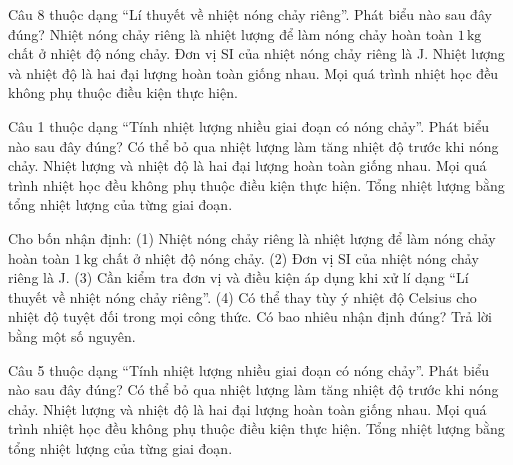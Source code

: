 \begin{ex}
Câu 8 thuộc dạng “Lí thuyết về nhiệt nóng chảy riêng”. Phát biểu nào sau đây đúng?
\choice
{\True Nhiệt nóng chảy riêng là nhiệt lượng để làm nóng chảy hoàn toàn $1\,\text{kg}$ chất ở nhiệt độ nóng chảy.}
{Đơn vị SI của nhiệt nóng chảy riêng là J.}
{Nhiệt lượng và nhiệt độ là hai đại lượng hoàn toàn giống nhau.}
{Mọi quá trình nhiệt học đều không phụ thuộc điều kiện thực hiện.}
\end{ex}

\begin{ex}
Câu 1 thuộc dạng “Tính nhiệt lượng nhiều giai đoạn có nóng chảy”. Phát biểu nào sau đây đúng?
\choice
{Có thể bỏ qua nhiệt lượng làm tăng nhiệt độ trước khi nóng chảy.}
{Nhiệt lượng và nhiệt độ là hai đại lượng hoàn toàn giống nhau.}
{Mọi quá trình nhiệt học đều không phụ thuộc điều kiện thực hiện.}
{\True Tổng nhiệt lượng bằng tổng nhiệt lượng của từng giai đoạn.}
\end{ex}

\begin{ex}
Cho bốn nhận định: (1) Nhiệt nóng chảy riêng là nhiệt lượng để làm nóng chảy hoàn toàn $1\,\text{kg}$ chất ở nhiệt độ nóng chảy. (2) Đơn vị SI của nhiệt nóng chảy riêng là J. (3) Cần kiểm tra đơn vị và điều kiện áp dụng khi xử lí dạng “Lí thuyết về nhiệt nóng chảy riêng”. (4) Có thể thay tùy ý nhiệt độ Celsius cho nhiệt độ tuyệt đối trong mọi công thức. Có bao nhiêu nhận định đúng? Trả lời bằng một số nguyên.
\end{ex}

\begin{ex}
Câu 5 thuộc dạng “Tính nhiệt lượng nhiều giai đoạn có nóng chảy”. Phát biểu nào sau đây đúng?
\choice
{Có thể bỏ qua nhiệt lượng làm tăng nhiệt độ trước khi nóng chảy.}
{Nhiệt lượng và nhiệt độ là hai đại lượng hoàn toàn giống nhau.}
{Mọi quá trình nhiệt học đều không phụ thuộc điều kiện thực hiện.}
{\True Tổng nhiệt lượng bằng tổng nhiệt lượng của từng giai đoạn.}
\end{ex}


